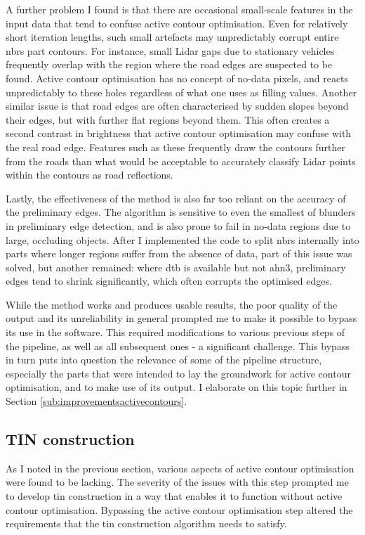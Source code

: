 A further problem I found is that there are occasional small-scale features in the input data that tend to confuse active contour optimisation. Even for relatively short iteration lengths, such small artefacts may unpredictably corrupt entire \ac{nbrs} part contours. For instance, small Lidar gaps due to stationary vehicles frequently overlap with the region where the road edges are suspected to be found. Active contour optimisation has no concept of no-data pixels, and reacts unpredictably to these holes regardless of what one uses as filling values. Another similar issue is that road edges are often characterised by sudden slopes beyond their edges, but with further flat regions beyond them. This often creates a second contrast in brightness that active contour optimisation may confuse with the real road edge. Features such as these frequently draw the contours further from the roads than what would be acceptable to accurately classify Lidar points within the contours as road reflections.

Lastly, the effectiveness of the method is also far too reliant on the accuracy of the preliminary edges. The algorithm is sensitive to even the smallest of blunders in preliminary edge detection, and is also prone to fail in no-data regions due to large, occluding objects. After I implemented the code to split \ac{nbrs} internally into parts where longer regions suffer from the absence of data, part of this issue was solved, but another remained: where \ac{dtb} is available but not \ac{ahn3}, preliminary edges tend to shrink significantly, which often corrupts the optimised edges.

While the method works and produces usable results, the poor quality of the output and its unreliability in general prompted me to make it possible to bypass its use in the software. This required modifications to various previous steps of the pipeline, as well as all subsequent ones - a significant challenge. This bypass in turn puts into question the relevance of some of the pipeline structure, especially the parts that were intended to lay the groundwork for active contour optimisation, and to make use of its output. I elaborate on this topic further in Section \ref{sub:improvementsactivecontours}.

\subsection{TIN construction}
\label{sub:m_tinconstruction}

As I noted in the previous section, various aspects of active contour optimisation were found to be lacking. The severity of the issues with this step prompted me to develop \ac{tin} construction in a way that enables it to function without active contour optimisation. Bypassing  the active contour optimisation step altered the requirements that the \ac{tin} construction algorithm needs to satisfy.

